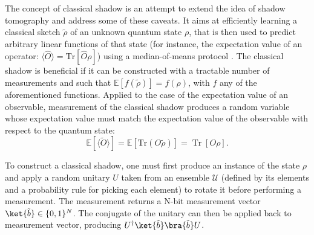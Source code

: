 The concept of classical shadow \cite{Huang2020} is an attempt to extend the idea of shadow tomography and address some of these caveats. It aims at efficiently learning a classical sketch $\tilde{\rho}$ of an unknown quantum state $\rho$, that is then used to predict arbitrary linear functions of that state (for instance, the expectation value of an operator: $\langle \hat{O} \rangle = \mathrm{Tr}[\hat{O} \rho]$) using a median-of-means protocol \cite{Jerrum1986, Nemirovsky1983}. The classical shadow is beneficial if it can be constructed with a tractable number of measurements and such that $\mathbb{E}[f(\tilde{\rho})] = f(\rho)$, with $f$ any of the aforementioned functions. Applied to the case of the expectation value of an observable, measurement of the classical shadow produces a random variable whose expectation value must match the expectation value of the observable with respect to the quantum state:
\begin{equation}
    \mathbb{E}[\langle \tilde{O} \rangle] = \mathbb{E}[\mathrm{Tr}(O \tilde{\rho})] = \operatorname{Tr}[O\rho].
\end{equation}

To construct a classical shadow, one must first produce an instance of the state $\rho$ and apply a random unitary $U$ taken from an ensemble $\mathcal{U}$ (defined by its elements and a probability rule for picking each element) to rotate it before performing a measurement. The measurement returns a N-bit measurement vector $\ket{\tilde{b}} \in \{0, 1 \}^N $. The conjugate of the unitary can then be applied back to measurement vector, producing $U^{\dagger}\ket{\tilde{b}}\bra{\tilde{b}}U$. 

